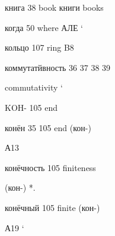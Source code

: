 \begin{minipage}[t]{0.475\textwidth}
\noindent книга 38 book книги books\par
\noindent когда 50 where АЛЕ ‘\par
\noindent кольцо 107 ring B8\par
\noindent коммутатйвность 36 37 38 39\par
\noindent commutativity ‘\par
\noindent KOH- 105 end\par
\noindent конён 35 105 end (кон-)\par
\noindent А13\par
\noindent конёчность 105 finiteness\par
\noindent (кон-) *.\par
\noindent конёчный 105 finite (кон-)\par
\noindent А19 ‘\par
\end{minipage}\hfill

